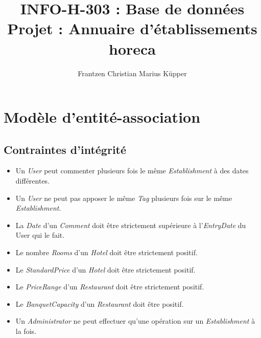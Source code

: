 \documentclass[11pt,a4paper]{report}
\author{Frantzen Christian Marius Küpper}
\title{INFO-H-303 : Base de données\\
		Projet : Annuaire d'établissements horeca}
\begin{document}
\maketitle
\section*{Modèle d'entité-association}
\subsection*{Contraintes d'intégrité}

\begin{itemize}
\item Un \textit{User} peut commenter plusieurs fois le même \textit{Establishment} à des dates différentes. 
\item Un \textit{User} ne peut pas apposer le même \textit{Tag} plusieurs fois sur le même \textit{Establishment}. 
\item La \textit{Date} d'un \textit{Comment} doit être strictement supérieure à l'\textit{EntryDate} du User qui le fait. 
\item Le nombre \textit{Rooms} d'un \textit{Hotel} doit être strictement positif. 
\item Le \textit{StandardPrice} d'un \textit{Hotel} doit être strictement positif. 
\item Le \textit{PriceRange} d'un \textit{Restaurant} doit être strictement positif. 
\item Le \textit{BanquetCapacity} d'un \textit{Restaurant} doit être positif. 
\item Un \textit{Administrator} ne peut effectuer qu'une opération sur un \textit{Establishment} à la fois. 
\end{itemize}
\end{document}
